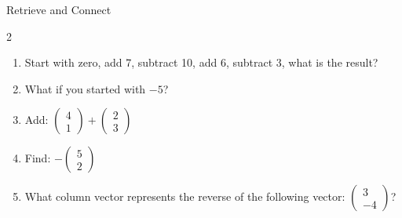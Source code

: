 \documentclass{beamer}
\newcommand{\ashow}[1]{\uncover<2->{\textcolor{red}{\small #1}}}
\begin{document}
\begin{frame}{Retrieve and Connect}
\hypertarget{q-st1}{}

\begin{multicols}{2}
\begin{enumerate}
  \item Start with zero, add 7, subtract 10, add 6, subtract 3, what is the result? \ashow{0}
  \item What if you started with $-5$? \ashow{$-5$}
  \item Add:
  $\begin{pmatrix}4\\1\end{pmatrix}
  +
  \begin{pmatrix}2\\3\end{pmatrix}$ \ashow{\(\binom{6}{4}\)}
  \item Find:
  $-\begin{pmatrix}5\\2\end{pmatrix}$ \ashow{\(\binom{-5}{-2}\)}
  \item What column vector represents the reverse of the following vector:
  $\begin{pmatrix}3\\-4\end{pmatrix}$? \ashow{\(\binom{-3}{4}\)}
\end{enumerate}
\end{multicols}

\vspace{0.3cm}



\begin{columns}[T]

\begin{center}
\end{center}


\end{columns}
\end{frame}
\end{document}
